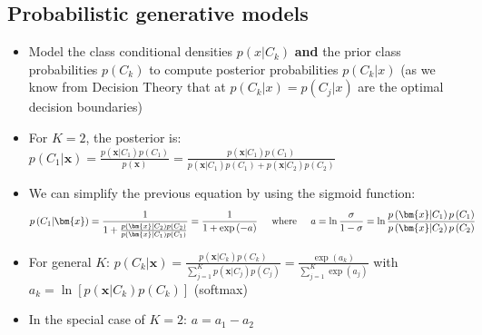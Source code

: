 \subsection{Probabilistic generative models}
\begin{itemize}
	\item Model the class conditional densities $p\left(x|C_k\right)$ \textbf{and} the prior class probabilities $p(C_k)$ to compute posterior probabilities $p\left(C_k|x\right)$ (as we know from Decision Theory that at $p\left(C_k|x\right)=p\left(C_j|x\right)$ are the optimal decision boundaries)
	\item For $K=2$, the posterior is: $p\left(C_1|\bm{x}\right) = \frac{p\left(\bm{x}|C_1\right)p\left(C_1\right)}{p\left(\bm{x}\right)} = \frac{p\left(\bm{x}|C_1\right)p\left(C_1\right)}{p\left(\bm{x}|C_1\right)p\left(C_1\right) + p\left(\bm{x}|C_2\right)p\left(C_2\right)}$
	\item We can simplify the previous equation by using the sigmoid function:
	\begin{equation*}
		\begin{split}
			p\left(C_1|\bm{x}\right) & = \frac{1}{1 + \frac{p\left(\bm{x}|C_2\right)p\left(C_2\right)}{p\left(\bm{x}|C_1\right)p\left(C_1\right)} } = \frac{1}{1+\exp\left(-a\right)} \text{\hspace{5mm}where\hspace{5mm}} a=\ln\frac{\sigma}{1-\sigma} = \ln \frac{p\left(\bm{x}|C_1\right)p\left(C_1\right)}{p\left(\bm{x}|C_2\right)p\left(C_2\right)}
		\end{split}
	\end{equation*}
	\item For general $K$: $p\left(C_k|\bm{x}\right) = \frac{p\left(\bm{x}|C_k\right)p\left(C_k\right)}{\sum_{j=1}^{K}p\left(\bm{x}|C_j\right)p\left(C_j\right)} = \frac{\exp(a_k)}{\sum_{j=1}^{K} \exp(a_j)}$ with $a_k = \ln \left[ p\left(\bm{x}|C_k\right)p\left(C_k\right)\right]$ (softmax)
	\item In the special case of $K=2$: $a=a_1-a_2$
\end{itemize}
